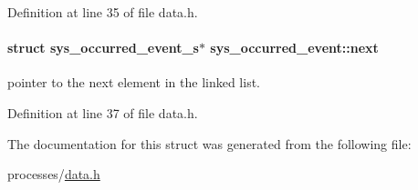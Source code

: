 Definition at line 35 of file data.\+h.

\hypertarget{structsys__occurred__event_a8d8c22b7afc5c9ca3f5a8fd817cfc814}{}
\paragraph[{next}]{\setlength{\rightskip}{0pt plus 5cm}struct sys\+\_\+occurred\+\_\+event\+\_\+s$\ast$ sys\+\_\+occurred\+\_\+event\+::next}\label{structsys__occurred__event_a8d8c22b7afc5c9ca3f5a8fd817cfc814}
pointer to the next element in the linked list. 

Definition at line 37 of file data.\+h.



The documentation for this struct was generated from the following file\+:\begin{DoxyCompactItemize}
\item 
processes/\hyperlink{data_8h}{data.\+h}\end{DoxyCompactItemize}
